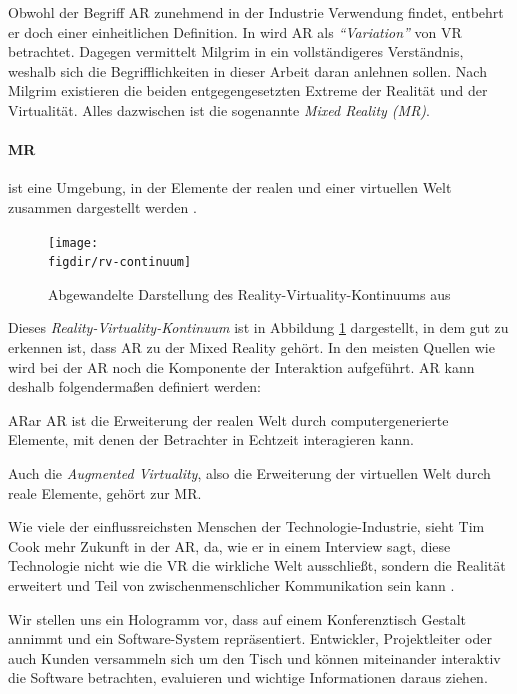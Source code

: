 Obwohl der Begriff AR zunehmend in der Industrie Verwendung findet, entbehrt er doch einer einheitlichen Definition. In \cite{azuma1997survey} wird AR als \emph{"`Variation"'} von VR betrachtet. Dagegen vermittelt Milgrim in \cite{milgram1995augmented} ein vollständigeres Verständnis, weshalb sich die Begrifflichkeiten in dieser Arbeit daran anlehnen sollen. Nach Milgrim existieren die beiden entgegengesetzten Extreme der Realität und der Virtualität. Alles dazwischen ist die sogenannte \emph{Mixed Reality (MR)}.

\paragraph{MR} ist eine Umgebung, in der Elemente der realen und einer virtuellen Welt zusammen dargestellt werden \cite{kato1999marker}.\\

\begin{figure}[htb]
  \texttt{[image: \\figdir/rv-continuum]}
  \caption{Abgewandelte Darstellung des Reality-Virtuality-Kontinuums aus \cite{milgram1995augmented}}
  \label{fig:rv-continuum}
\end{figure}

Dieses \emph{Reality-Virtuality-Kontinuum} ist in Abbildung \ref{fig:rv-continuum} dargestellt, in dem gut zu erkennen ist, dass AR zu der Mixed Reality gehört. In den meisten Quellen wie \cite{azuma1997survey, azuma2001recent, kato1999marker} wird bei der AR noch die Komponente der Interaktion aufgeführt. AR kann deshalb folgendermaßen definiert werden:

\begin{defbox}{AR}{ar}
   AR ist die Erweiterung der realen Welt durch computergenerierte Elemente, mit denen der Betrachter in Echtzeit interagieren kann.
\end{defbox}

Auch die \emph{Augmented Virtuality}, also die Erweiterung der virtuellen Welt durch reale Elemente, gehört zur MR.

Wie viele der einflussreichsten Menschen der Technologie-Industrie, sieht Tim Cook mehr Zukunft in der AR, da, wie er in einem Interview sagt, diese Technologie nicht wie die VR die wirkliche Welt ausschließt, sondern die Realität erweitert und Teil von zwischenmenschlicher Kommunikation sein kann \cite{theindependent2017apple}.

Wir stellen uns ein Hologramm vor, dass auf einem Konferenztisch Gestalt annimmt und ein Software-System repräsentiert. Entwickler, Projektleiter oder auch Kunden versammeln sich um den Tisch und können miteinander interaktiv die Software betrachten, evaluieren und wichtige Informationen daraus ziehen.

